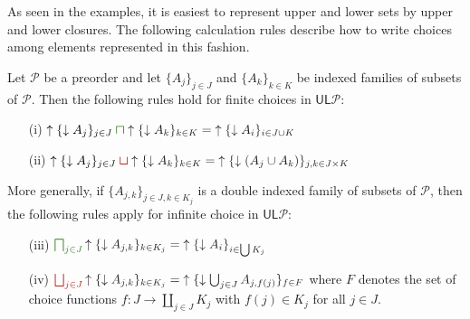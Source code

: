 \documentclass[12pt]{article}
\theoremstyle{definition}
\theoremstyle{plain}
\theoremstyle{plain}
\theoremstyle{plain}
\theoremstyle{plain}
\theoremstyle{remark}
\theoremstyle{remark}
\newcommand{\mc}[1]{\mathcal{#1}}
\newcommand{\low}{\mathsf{L}}
\newcommand{\upper}{\mathsf{U}}
\newcommand{\upc}[1]{{\uparrow #1}}
\newcommand{\lwc}[1]{{\downarrow #1}}
\newcommand{\cbigsqcap}[1]{\color{OliveGreen}\bigsqcap_{#1}\color{Black}}
\newcommand{\csqcap}{\color{OliveGreen}\bm{\sqcap}\color{Black}}
\newcommand{\cbigsqcup}[1]{\color{BrickRed}\bigsqcup_{#1}\color{Black}}
\newcommand{\csqcup}{\color{BrickRed}\bm{\sqcup}\color{Black}}
\begin{document}
As seen in the examples, it is easiest to represent upper and lower sets by upper and lower closures. The following calculation rules describe how to write choices among elements represented in this fashion.
\begin{tcolorbox}[title = \hypertarget{box:calc rules} {Calculation Rules} for Upper and Lower Closures, colframe=TealBlue, coltitle=Sepia, colback=paleteal] 
		Let $\mc{P}$ be a preorder and let $\{A_j\}_{j \in J}$ and $\{A_k\}_{k \in K}$ be indexed families of subsets of $\mc{P}$. Then the following rules hold for finite choices in $\upper\low\mc{P}$:
		\begin{itemize}
			\item[(i)] $\upc{\{ \lwc{A_j} \}_{j \in J}} \csqcap \upc{\{ \lwc{A_k} \}_{k \in K}} = \upc \{ \lwc{A_i} \}_{i \in J \cup K}$
			\item[(ii)] $\upc{\{ \lwc{A_j} \}_{j \in J}} \csqcup \upc{\{ \lwc{A_k} \}_{k \in K}} = \upc \{ \lwc{(A_j \cup A_k)} \}_{j,k \in J \times K}$
		\end{itemize}
		More generally, if $\{ A_{j,k} \}_{j \in J, k \in K_j}$ is a double indexed family of subsets of $\mc{P}$, then the following rules apply for infinite choice in $\upper\low\mc{P}$:
		\begin{itemize}
			\item[(iii)] $\cbigsqcap{j \in J} \upc{\{ \lwc{A_{j,k}} \}_{k \in K_j}} = \upc \{ \lwc{A_i} \}_{i \in \bigcup K_j }$
			\item[(iv)] $\cbigsqcup{j \in J} \upc{\{ \lwc{A_{j,k}} \}_{k \in K_j}} = \upc \{ \lwc{ \bigcup_{j \in J} A_{j,f(j)}} \}_{f \in F}$ \newline where $F$ denotes the set of choice functions $f: J \rightarrow \coprod_{j \in J} K_j$ with $f(j) \in K_j$ for all $j \in J$.
\end{itemize}
\end{tcolorbox}
\end{document}
